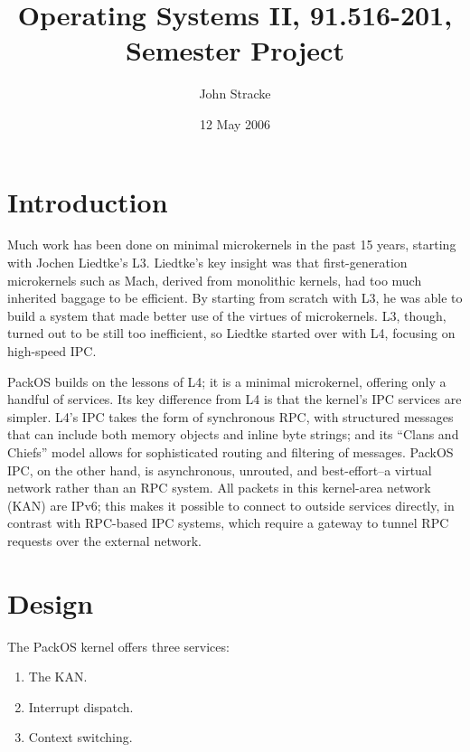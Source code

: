 \documentclass{article}
\title{Operating Systems II, 91.516-201, Semester Project}
\author{John Stracke}
\date{12 May 2006}
\begin{document}
\maketitle


\section{Introduction}

Much work has been done on minimal
microkernels  in the past 15 years,
starting with Jochen Liedtke's L3.\cite{Liedtke:1993}
Liedtke's key insight was that first-generation microkernels such as
Mach, derived from monolithic kernels, had too much inherited baggage
to be efficient.  By starting from scratch with L3, he was able to
build a system that made better use of the virtues of microkernels.
L3, though, turned out to be still too inefficient, so Liedtke started
over with L4, focusing on high-speed IPC.\cite{Liedtke:AchievedIPC}

PackOS builds on the lessons of L4; it is a minimal microkernel,
offering only a handful of services.  Its key difference from L4 is
that the kernel's IPC services are simpler.  L4's IPC takes the form
of synchronous RPC, with structured messages that can include both
memory objects and inline byte strings; and its
``Clans and Chiefs''\cite{Liedtke:ClansAndChiefs}
model allows for sophisticated routing and filtering of messages.
PackOS IPC, on the other hand, is asynchronous, unrouted, and
best-effort--a virtual network rather than an RPC system.  All packets
in this kernel-area network (KAN) are IPv6; this makes it possible to
connect to outside services directly, in contrast with RPC-based IPC
systems, which require a gateway to tunnel RPC requests over the
external network.

\section{Design}

The PackOS kernel offers three services:

\begin{enumerate}
\item{The KAN.}
\item{Interrupt dispatch.}
\item{Context switching.}
\end{enumerate}
\end{document}
